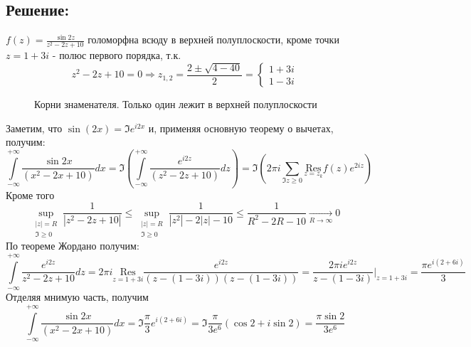 \documentclass{article}
\begin{document}
	\subsection{Решение:}
		$f(z) = \frac{\sin 2z}{z^2 -2z+10}$ голоморфна всюду в верхней полуплоскости, кроме точки $z  =1+3i$ - полюс первого порядка, т.к.
	\[z^2 -2z + 10 = 0 \Rightarrow z_{1,2} = \frac{2 \pm \sqrt{4 - 40}}{2} = \begin{cases}
		1 + 3i \\
		1 - 3i
	\end{cases}\]
	\begin{figure}[h]
		\centering
		\caption{Корни знаменателя. Только один лежит в верхней полуплоскости}
		
	\end{figure}
	\newline
	Заметим, что $\sin(2x) = \Im e^{i2x} $ и, применяя основную теорему о вычетах, получим:
	\[\int\limits_{-\infty}^{+\infty} \frac{\sin 2x}{\left(x^2 - 2x + 10\right)}dx = \Im \left(\int\limits_{-\infty}^{+\infty} \frac{e^{i2z}}{\left(z^2 - 2z + 10\right)}dz\right) = \Im \left(2\pi i \sum_{\Im z \ge 0} \underset{z=z_k}{\text{Res}}f(z)e^{2iz}\right)\]
	Кроме того
	\[\sup\limits_{\substack{|z|= R\\\Im\ge0}} \frac{1}{|z^2 -2z +10|} \le\sup\limits_{\substack{|z|= R\\\Im\ge0}}\frac{1}{|z^2|- 2|z| - 10} \le \frac{1}{R^2 -2R - 10} \underset{R\rightarrow \infty}{\rightarrow} 0\]
	По теореме Жордано получим:
	\[\int\limits_{-\infty}^{+\infty} \frac{e^{i2z}}{z^2 -2z + 10} dz= 2 \pi i \underset{z = 1 + 3i}{\text{Res}}\frac{e^{i2z}}{(z-(1-3i))(z-(1-3i))} = \frac{2\pi i e ^{i2z}}{z-(1-3i)}\Big|_{z=1+3i} = \frac{\pi e^{i(2+6i)}}{3}\]
	Отделяя мнимую часть, получим
	\[\int\limits_{-\infty}^{+\infty} \frac{\sin 2x}{\left(x^2 - 2x + 10\right)}dx = \Im \frac{\pi}{3}e^{i(2+6i)} = \Im \frac{\pi}{3 e^6} (\cos 2 + i \sin 2) = \frac{\pi \sin 2}{3e^{6}}\]
\end{document}
